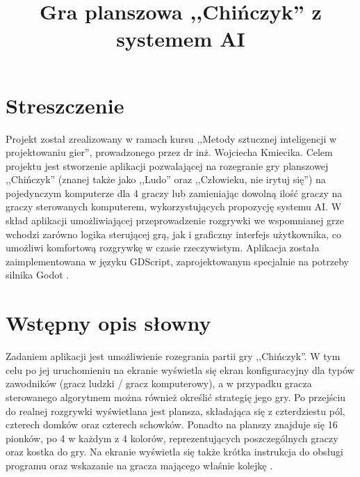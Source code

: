 \documentclass[conference]{IEEEtran}
\begin{document}
\title{Gra planszowa ,,Chińczyk'' z systemem AI}

\author{
\and
{}
\and
{}
}


\maketitle


\section{Streszczenie}
Projekt został zrealizowany w ramach kursu ,,Metody sztucznej inteligencji w projektowaniu gier'', prowadzonego przez dr inż. Wojciecha Kmiecika. Celem projektu jest stworzenie aplikacji pozwalającej na rozegranie gry planszowej ,,Chińczyk'' (znanej także jako ,,Ludo'' oraz ,,Człowieku, nie irytuj się'') na pojedynczym komputerze dla 4 graczy lub zamieniając dowolną ilość graczy na graczy sterowanych komputerem, wykorzystujących propozycję systemu AI. W skład aplikacji umożliwiającej przeprowadzenie rozgrywki we wspomnianej grze wchodzi zarówno logika sterującej grą, jak i graficzny interfejs użytkownika, co umożliwi komfortową rozgrywkę w czasie rzeczywistym. Aplikacja została zaimplementowana w języku GDScript, zaprojektowanym specjalnie na potrzeby silnika Godot \cite{godot}.

\section{Wstępny opis słowny}
Zadaniem aplikacji jest umożliwienie rozegrania partii gry ,,Chińczyk''. W tym celu po jej uruchomieniu na ekranie wyświetla się ekran konfiguracyjny dla typów zawodników (gracz ludzki / gracz komputerowy), a w przypadku gracza sterowanego algorytmem można również określić strategię jego gry. Po przejściu do realnej rozgrywki wyświetlana jest plansza, składająca się z czterdziestu pól, czterech domków oraz czterech schowków. Ponadto na planszy znajduje się 16 pionków, po 4 w każdym z 4 kolorów, reprezentujących poszczególnych graczy oraz kostka do gry. Na ekranie wyświetla się także krótka instrukcja do obsługi programu oraz wskazanie na gracza mającego właśnie kolejkę \cite{wiki}.
\end{document}
